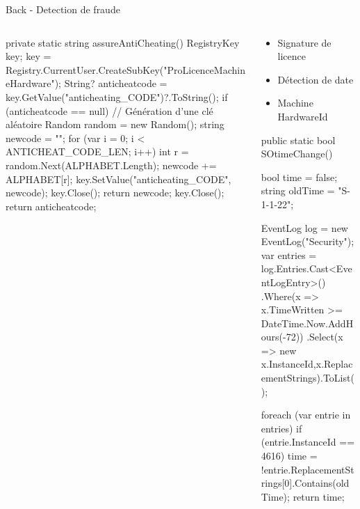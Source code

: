 \documentclass{cubeamer}
\begin{document}
\begin{frame}[fragile]{Back - Detection de fraude}
    \begin{columns}
        \hspace{-1cm} 
        \begin{column}{.4\textwidth}

\begin{code}{}
private static string assureAntiCheating()
{
    RegistryKey key;
    key = Registry.CurrentUser.CreateSubKey("ProLicenceMachineHardware");
    String? anticheatcode = key.GetValue("anticheating_CODE")?.ToString();
    if (anticheatcode == null)
    {
        // Génération d'une clé aléatoire
        Random random = new Random();
        string newcode = "";
        for (var i = 0; i < ANTICHEAT_CODE_LEN; i++)
        {
            int r = random.Next(ALPHABET.Length);
            newcode += ALPHABET[r];
        }
        key.SetValue("anticheating_CODE", newcode);
        key.Close();
        return newcode;
    }
    key.Close();
    return anticheatcode;
}
\end{code}            
        \end{column}

        \begin{column}{.5\textwidth}
            \begin{itemize}\raggedleft
                \item Signature de licence
                \item Détection de date
                \item Machine HardwareId
            \end{itemize}
\begin{code}{}
public static bool SOtimeChange()
{
    bool time = false;
    string oldTime = "S-1-1-22";    

    EventLog log = new EventLog("Security");
    var entries = log.Entries.Cast<EventLogEntry>()
        .Where(x => x.TimeWritten >= DateTime.Now.AddHours(-72))
        .Select(x => new {x.InstanceId,x.ReplacementStrings}).ToList();

            foreach (var entrie in entries)
            {
                if (entrie.InstanceId == 4616)
                {
                    time = !entrie.ReplacementStrings[0].Contains(oldTime);
                }
            }
    return time;
}
\end{code}                    
        \end{column}

    \end{columns}
\end{frame}
\end{document}
